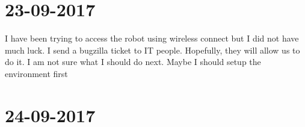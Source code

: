 \documentclass{article}
\begin{document}
 


\begin{abstract} 
\end{abstract} 

\section{23-09-2017}
I have been trying to access the robot using wireless connect but I did not have much luck.
I send a bugzilla ticket to IT people. Hopefully, they will allow us to do it.
I am not sure what I should do next. Maybe I should setup the environment first

\section{24-09-2017}

\subsection{}

\nocite{langley00}



\end{document}
